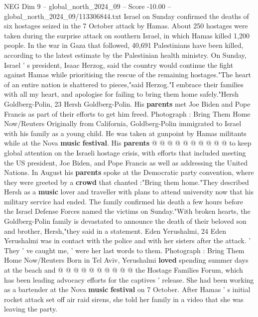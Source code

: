 \begin{textsample}{NEG Dim 9 – global\_north\_2024\_09 – Score -10.00 – global\_north\_2024\_09/113306844.txt}  \label{ex:f9_neg_017}
Israel on Sunday confirmed the deaths of six hostages seized in the 7 October attack by Hamas.
About 250 hostages were taken during the surprise attack on southern Israel, in which Hamas killed 1,200 people.
In the war in Gaza that followed, 40,691 Palestinians have been killed, according to the latest estimate by the Palestinian health ministry.
On Sunday, Israel ' s president, Isaac Herzog, said the country would continue the fight against Hamas while prioritising the rescue of the remaining hostages."The heart of an entire nation is shattered to pieces,"said Herzog."I embrace their families with all my heart, and apologise for failing to bring them home safely."Hersh Goldberg-Polin, 23 Hersh Goldberg-Polin.
His \textbf{parents} met Joe Biden and Pope Francis as part of their efforts to get him freed.
Photograph : Bring Them Home Now/Reuters Originally from California, Goldberg-Polin immigrated to Israel with his family as a young child.
He was taken at gunpoint by Hamas militants while at the Nova \textbf{music} \textbf{festival}.
His \textbf{parents} @ @ @ @ @ @ @ @ @ @ to keep global attention on the Israeli hostage crisis, with efforts that included meeting the US president, Joe Biden, and Pope Francis as well as addressing the United Nations.
In August his \textbf{parents} spoke at the Democratic party convention, where they were greeted by a \textbf{crowd} that chanted :"Bring them home."They described Hersh as a \textbf{music} lover and traveller with plans to attend university now that his military service had ended.
The family confirmed his death a few hours before the Israel Defense Forces named the victims on Sunday."With broken hearts, the Goldberg-Polin family is devastated to announce the death of their beloved son and brother, Hersh,"they said in a statement.
Eden Yerushalmi, 24 Eden Yerushalmi was in contact with the police and with her sisters after the attack. ' They ' ve caught me, ' were her last words to them.
Photograph : Bring Them Home Now/Reuters Born in Tel Aviv, Yerushalmi \textbf{loved} spending summer days at the beach and @ @ @ @ @ @ @ @ @ @ the Hostage Families Forum, which has been leading advocacy efforts for the captives ' release.
She had been working as a bartender at the Nova \textbf{music} \textbf{festival} on 7 October.
After Hamas ' s initial rocket attack set off air raid sirens, she told her family in a video that she was leaving the party.

\end{textsample}
